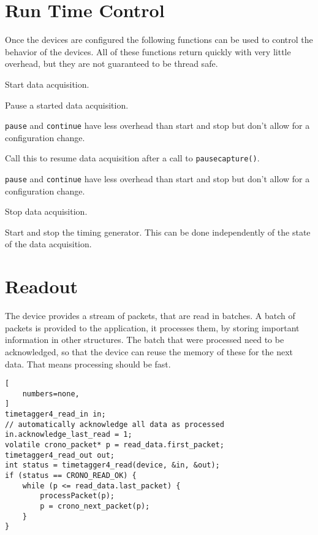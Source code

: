 
\section{Run Time Control}

Once the devices are configured the following functions can be used to control
the behavior of the devices.  All of these functions return quickly with very
little overhead, but they are not guaranteed to be thread safe.

\begin{description}[style=nextline]
    \item[\ttvar{int}{start\tu capture(}\device)]
    Start data acquisition.\par

    \item[\ttvar{int}{pause\tu capture(}\device)]
    Pause a started data acquisition. \par
    \texttt{pause} and \texttt{continue} have less overhead than start and
    stop but don't allow for a configuration change.

    \item[\ttvar{int}{continue\tu capture(}\device)]
    Call this to resume data acquisition after a call to
    \texttt{\prefix pause\tu capture()}. \par
    \texttt{pause} and \texttt{continue} have less overhead than start and
    stop but don't allow for a configuration change.

    \item[\ttvar{int}{stop\tu capture(}\device)]
    Stop data acquisition.\par
    
    \item[\protect{\parbox[b]{0.8\linewidth}{
        \ttvar{int}{start\tu tiger(}\device)\\
        \ttvar{int}{stop\tu tiger(}\device)}}]
    Start and stop the timing generator. This can be done independently of the
    state of the data acquisition.
\end{description}

\section{Readout}
The device provides a stream of packets, that are read in batches. A batch of
packets is provided to the application, it processes them, by storing important information
in other structures. The batch that were processed need to be acknowledged, so that
the device can reuse the memory of these for the next data. That means processing
should be fast. 
\begin{lstlisting}[
    numbers=none,
]
timetagger4_read_in in;
// automatically acknowledge all data as processed
in.acknowledge_last_read = 1;
volatile crono_packet* p = read_data.first_packet;
timetagger4_read_out out;
int status = timetagger4_read(device, &in, &out);
if (status == CRONO_READ_OK) {
    while (p <= read_data.last_packet) {
        processPacket(p);
        p = crono_next_packet(p);
    }    
}
\end{lstlisting}
    
